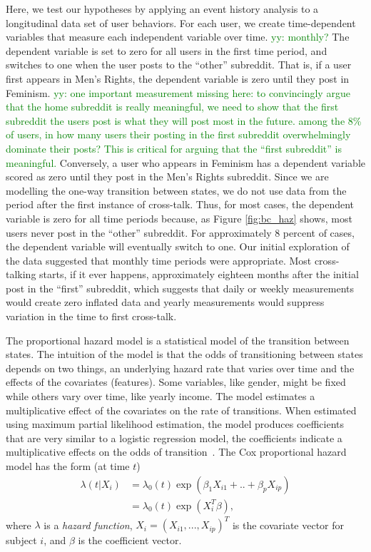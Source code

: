 \documentclass[letterpaper]{article}
\newcommand{\yy}[1]{{\textcolor{green}{yy: #1}}}
\begin{document}
Here, we test our hypotheses by applying an event history analysis to a longitudinal data set of user behaviors. For each user, we create time-dependent variables that measure each independent variable over time. \yy{monthly?} The dependent variable is set to zero for all users in the first time period, and switches to one when the user posts to the ``other'' subreddit. That is, if a user first appears in Men's Rights, the dependent variable is zero until they post in Feminism. \yy{one important measurement missing here: to convincingly argue that the home subreddit is really meaningful, we need to show that the first subreddit the users post is what they will post most in the future. among the 8\% of users, in how many users their posting in the first subreddit overwhelmingly dominate their posts? This is critical for arguing that the ``first subreddit'' is meaningful.} Conversely, a user who appears in Feminism has a dependent variable scored as zero until they post in the Men's Rights subreddit. Since we are modelling the one-way transition between states, we do not use data from the period after the first instance of cross-talk. Thus, for most cases, the dependent variable is zero for all time periods because, as Figure \ref{fig:bc_haz} shows, most users never post in the ``other'' subreddit. For approximately 8 percent of cases, the dependent variable will eventually switch to one. Our initial exploration of the data suggested that monthly time periods were appropriate. Most cross-talking starts, if it ever happens, approximately eighteen months after the initial post in the ``first'' subreddit, which suggests that daily or weekly measurements would create zero inflated data and yearly measurements would suppress variation in the time to first cross-talk.

The proportional hazard model is a statistical model of the transition between states. The intuition of the model is that the odds of transitioning between states depends on two things, an underlying hazard rate that varies over time and the effects of the covariates (features). Some variables, like gender, might be fixed while others vary over time, like yearly income. The model estimates a multiplicative effect of the covariates on the rate of transitions. When estimated using maximum partial likelihood estimation, the model produces coefficients that are very similar to a logistic regression model, the coefficients indicate a multiplicative effects on the odds of transition~\cite{blossfeld2014event}. %
The Cox proportional hazard model has the form (at time $t$)\\
\begin{equation}
\begin{split}
\lambda(t | X_{i}) & = \lambda_{0}(t) \exp(\beta_{1}X_{i1}+..+\beta_{p}X_{ip}) \\ 
&= \lambda_{0}(t) \exp (X_{i}^T \beta), 
\end{split}
\end{equation}
where $\lambda$ is a \emph{hazard function}, $X_{i} = (X_{i1},. . ., X_{ip})^T$ is the covariate vector for subject $i$, and $\beta$ is the coefficient vector. 
\end{document}
